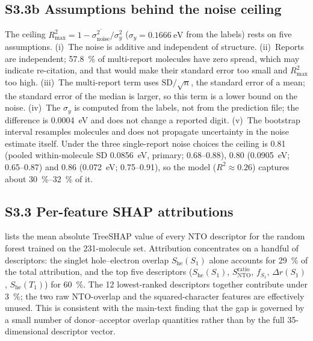 \documentclass[final,3p,times,twocolumn]{elsarticle}
\begin{document}
\subsection*{S3.3b Assumptions behind the noise ceiling}
\label{sec:r2max_assumptions}
The ceiling $R^2_\text{max} = 1 - \overline{\sigma^2_\text{noise}}/\sigma^2_y$ ($\sigma_y = \qty{0.1666}{\electronvolt}$ from the labels) rests on five
assumptions. (i)~The noise is additive and independent of structure. (ii)~Reports are independent;
\qty{57.8}{\percent} of multi-report molecules have zero spread, which may indicate re-citation, and
that would make their standard error too small and $R^2_\text{max}$ too high. (iii)~The multi-report
term uses $\mathrm{SD}/\sqrt{n}$, the standard error of a mean; the standard error of the median is larger, so
this term is a lower bound on the noise. (iv)~The $\sigma_y$ is computed from the labels, not from the prediction file; the difference
is \qty{0.0004}{\electronvolt} and does not change a reported digit. (v)~The bootstrap interval resamples molecules and does not
propagate uncertainty in the noise estimate itself. Under the three single-report noise choices the ceiling is
\num{0.81} (pooled within-molecule SD \qty{0.0856}{\electronvolt}, primary; \numrange{0.68}{0.88}), \num{0.80}
(\qty{0.0905}{\electronvolt}; \numrange{0.65}{0.87}) and \num{0.86} (\qty{0.072}{\electronvolt}; \numrange{0.75}{0.91}), so the model
($R^2 \approx 0.26$) captures about \qtyrange{30}{32}{\percent} of it.

\subsection*{S3.3 Per-feature SHAP attributions}
 lists the mean absolute TreeSHAP value of every NTO descriptor for
the random forest trained on the \num{231}-molecule set. Attribution concentrates
on a handful of descriptors: the singlet hole--electron overlap $S_\text{he}(S_1)$
alone accounts for \qty{29}{\percent} of the total attribution, and the top five
descriptors ($S_\text{he}(S_1)$, $S_\text{NTO}^{\text{ratio}}$, $f_{S_1}$,
$\Delta r(S_1)$, $S_\text{he}(T_1)$) for \qty{60}{\percent}. The \num{12}
lowest-ranked descriptors together contribute under \qty{3}{\percent}; the two
raw NTO-overlap and the squared-character features are effectively unused. This is
consistent with the main-text finding that the gap is governed by a small number
of donor--acceptor overlap quantities rather than by the full \num{35}-dimensional
descriptor vector.
\end{document}
